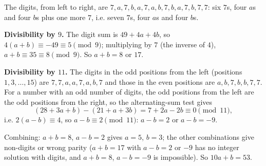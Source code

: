 The digits, from left to right, are $7,a,7,b,a,7,a,b,7,b,a,7,b,7,7$: six $7$s, four $a$s and four $b$s plus one more $7$, i.e. seven $7$s, four $a$s and four $b$s.

\textbf{Divisibility by $9$.} The digit sum is $49+4a+4b$, so $4(a+b)\equiv-49\equiv5\pmod9$; multiplying by $7$ (the inverse of $4$), $a+b\equiv35\equiv8\pmod9$. So $a+b=8$ or $17$.

\textbf{Divisibility by $11$.} The digits in the odd positions from the left (positions $1,3,\dots,15$) are $7,7,a,a,7,a,b,7$ and those in the even positions are $a,b,7,b,b,7,7$. For a number with an odd number of digits, the odd positions from the left are the odd positions from the right, so the alternating-sum test gives
\[
(28+3a+b)-(21+a+3b)=7+2a-2b\equiv0\pmod{11},
\]
i.e. $2(a-b)\equiv4$, so $a-b\equiv2\pmod{11}$: $a-b=2$ or $a-b=-9$.

Combining: $a+b=8$, $a-b=2$ gives $a=5$, $b=3$; the other combinations give non-digits or wrong parity ($a+b=17$ with $a-b=2$ or $-9$ has no integer solution with digits, and $a+b=8$, $a-b=-9$ is impossible). So $10a+b=\boxed{53}$.
